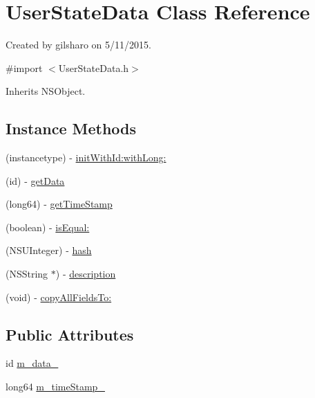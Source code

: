 \hypertarget{interface_user_state_data}{}\section{User\+State\+Data Class Reference}
\label{interface_user_state_data}


Created by gilsharo on 5/11/2015.  




{\ttfamily \#import $<$User\+State\+Data.\+h$>$}



Inherits N\+S\+Object.

\subsection*{Instance Methods}
\begin{DoxyCompactItemize}
\item 
(instancetype) -\/ \hyperlink{interface_user_state_data_a33358ba6ae53654d2ba259dc129a4307}{init\+With\+Id\+:with\+Long\+:}
\item 
(id) -\/ \hyperlink{interface_user_state_data_a72559bce3534a489d88aa795dabc51d2}{get\+Data}
\item 
(long64) -\/ \hyperlink{interface_user_state_data_afaee84ab0c763be84412d600b5f0cc82}{get\+Time\+Stamp}
\item 
(boolean) -\/ \hyperlink{interface_user_state_data_ae4575c60fb375091bc469dc2b6f9194d}{is\+Equal\+:}
\item 
(N\+S\+U\+Integer) -\/ \hyperlink{interface_user_state_data_a9341fd059166db369c6193fe5def378b}{hash}
\item 
(N\+S\+String $\ast$) -\/ \hyperlink{interface_user_state_data_a41456c70d01ccd7dcdd68e928f446ba0}{description}
\item 
(void) -\/ \hyperlink{interface_user_state_data_a74d156e8c7c8726bf7688cef24776461}{copy\+All\+Fields\+To\+:}
\end{DoxyCompactItemize}
\subsection*{Public Attributes}
\begin{DoxyCompactItemize}
\item 
id \hyperlink{interface_user_state_data_ad61b0fe3306f1569edaca391ce3e1a96}{m\+\_\+data\+\_\+}
\item 
long64 \hyperlink{interface_user_state_data_adc190d8e2ee84f5e7eedf8a3313d40fa}{m\+\_\+time\+Stamp\+\_\+}
\end{DoxyCompactItemize}


